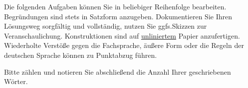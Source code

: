 {\footnotesize Die folgenden Aufgaben können Sie in beliebiger Reihenfolge bearbeiten. Begründungen sind stets in Satzform anzugeben. Dokumentieren Sie Ihren Lösungsweg sorgfältig und vollständig, nutzen Sie ggfs.\@ Skizzen zur Veranschaulichung. Konstruktionen sind auf \uline{unliniertem} Papier anzufertigen. Wiederholte Verstöße gegen die Fachsprache, äußere Form oder die Regeln der deutschen Sprache können zu Punktabzug führen. 

Bitte zählen und notieren Sie abschließend die Anzahl Ihrer geschriebenen Wörter.}\normalsize